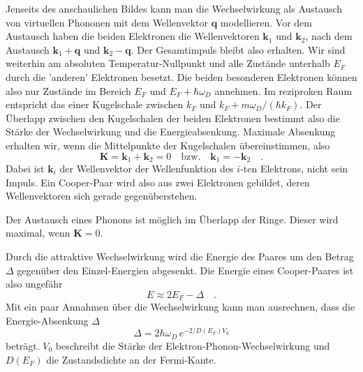 Jenseits des anschaulichen Bildes kann man die Wechselwirkung als Austausch von virtuellen Phononen mit dem Wellenvektor $\bm{q}$ modellieren. Vor dem Austausch haben die beiden Elektronen die Wellenvektoren $\bm{k}_1$ und $\bm{k}_2$, nach dem Austausch $\bm{k}_1 + \bm{q}$ und $\bm{k}_2 - \bm{q}$. Der Gesamtimpuls bleibt also erhalten. Wir sind weiterhin am absoluten Temperatur-Nullpunkt und alle Zustände unterhalb $E_F$ durch die 'anderen' Elektronen besetzt. Die beiden besonderen Elektronen können  also nur Zustände im Bereich $E_F$ und $E_F + \hbar \omega_D$ annehmen. Im reziproken Raum entspricht das einer Kugelschale zwischen $k_F$ und $k_F + m \omega_D / (\hbar k_F)$. Der Überlapp zwischen den Kugelschalen der beiden Elektronen bestimmt also die Stärke der Wechselwirkung und die  Energieabsenkung. Maximale Absenkung erhalten wir, wenn die Mittelpunkte der Kugelschalen übereinstimmen, also 
\begin{equation}
    \bm{K} = \bm{k}_1 + \bm{k}_2 = 0 \quad \text{bzw.} \quad  \bm{k}_1 = - \bm{k}_2  \quad .
\end{equation}
Dabei ist $\bm{k}_i$ der Wellenvektor der Wellenfunktion des $i$-ten Elektrons, nicht sein Impuls.
Ein Cooper-Paar wird also aus zwei Elektronen gebildet, deren Wellenvektoren sich gerade gegenüberstehen. 


\begin{marginfigure}
    \caption{Der Austausch eines Phonons ist möglich im Überlapp der Ringe. Dieser wird maximal, wenn $\bm{K}= 0$.}
\end{marginfigure}

Durch die attraktive Wechselwirkung wird die Energie des Paares um den Betrag $\Delta$ gegenüber den Einzel-Energien abgesenkt. Die Energie eines Cooper-Paares ist also ungefähr
\begin{equation}
    E \approx 2 E_F - \Delta  \quad .
\end{equation}
Mit ein paar Annahmen über die Wechselwirkung kann man ausrechnen, dass die Energie-Absenkung $\Delta$
\begin{equation}
    \Delta = 2 \hbar \omega_D \, e^{-2 / D(E_F) V_0}
\end{equation}
beträgt. $V_0$ beschreibt die Stärke der Elektron-Phonon-Wechselwirkung und $D(E_F)$ die Zustandsdichte an der Fermi-Kante.

